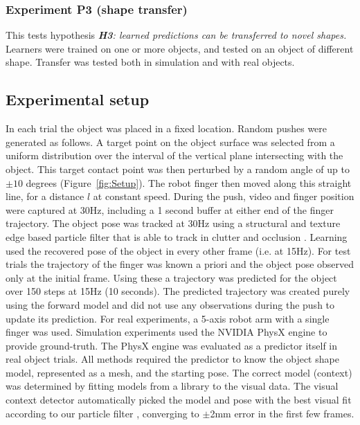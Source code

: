 \subsubsection{Experiment P3 (shape transfer)} This tests hypothesis {\em {\bf H3}: learned predictions can be transferred to novel shapes.} Learners were trained on one or more objects, and tested on an object of different shape. Transfer was tested both in simulation and with real objects.

\subsection{Experimental setup}\label{sec:Experiment.Setup}

In each trial the object was placed in a fixed location. Random pushes were generated as follows. A target point on the object surface was selected from a uniform distribution over the interval of the vertical plane intersecting with the object. This target contact point was then perturbed by a random angle of up to $\pm 10$ degrees (Figure~\ref{fig:Setup}). The robot finger then moved along this straight line, for a distance $l$ at constant speed. During the push, video and finger position were captured at 30Hz, including a 1 second buffer at either end of the finger trajectory. The object pose was tracked at 30Hz using a structural and texture edge based particle filter that is able to track in clutter and occlusion \citep{morwald_edge_2009}. Learning used the recovered pose of the object in every other frame (i.e. at 15Hz). For test trials the trajectory of the finger was known a priori and the object pose observed only at the initial frame. Using these a trajectory was predicted for the object over 150 steps at 15Hz (10 seconds). The predicted trajectory was created purely using the forward model and did not use any observations during the push to update its prediction. For real experiments, a 5-axis robot arm with a single finger was used. Simulation experiments used the NVIDIA PhysX engine \citep{nvidia_physx} to provide ground-truth. The PhysX engine was evaluated as a predictor itself in real object trials. All methods required the predictor to know the object shape model, represented as a mesh, and the starting pose. The correct model (context) was determined by fitting models from a library to the visual data. The visual context detector automatically picked the model and pose with the best visual fit according to our particle filter \citep{morwald_edge_2009}, converging to $\pm$2mm error in the first few frames. 

